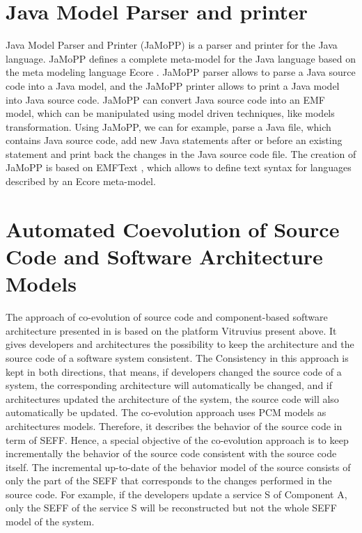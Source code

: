 \section{Java Model Parser and printer}
\label{sec:Java Model Parser and printer}

Java Model Parser and Printer (JaMoPP) \cite{heidenreich2009closing} is a parser and printer for the Java language. JaMoPP defines a complete meta-model for the Java language based on the meta modeling language Ecore \cite{steinberg2008emf}. JaMoPP parser allows to parse a Java source code into a Java model, and the JaMoPP printer allows to print a Java model into Java source code. JaMoPP can convert Java source code into an EMF model, which can be manipulated using model driven techniques, like models transformation. Using JaMoPP, we can for example, parse a Java file, which contains Java source code, add new Java statements after or before an existing statement and print back the changes in the Java source code file. The creation of JaMoPP is based on EMFText \cite{heidenreich2009derivation}, which allows to define text syntax for languages described by an Ecore meta-model. 


\section{Automated Coevolution of Source Code and Software Architecture Models}
\label{sec:Automated Coevolution of Source Code and Software Architecture Models}
The approach of co-evolution of source code and component-based software architecture presented in \cite{langhammer2015co, langhammer2017automated} is based on the platform Vitruvius present above. It gives developers and architectures the possibility to keep the architecture and the source code of a software system consistent. The Consistency in this approach is kept in both directions, that means, if developers changed the source code of a system, the corresponding architecture will automatically be changed, and if architectures updated the architecture of the system, the source code will also automatically be updated. The co-evolution approach uses PCM models as architectures models.  Therefore, it describes the behavior of the source code in term of SEFF. Hence, a special objective of the co-evolution approach is to keep incrementally the behavior of the source code consistent with the source code itself. The incremental up-to-date of the behavior model of the source consists of only the part of the SEFF that corresponds to the changes performed in the source code. For example, if the developers update a service S of Component A, only the SEFF of the service S will be reconstructed but not the whole SEFF model of the system. 

